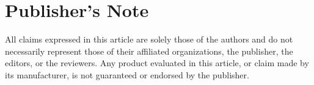 \section{Publisher's Note}

All claims expressed in this article are solely those of the authors and do not necessarily represent those of their affiliated organizations, the publisher, the editors, or the reviewers. Any product evaluated in this article, or claim made by its manufacturer, is not guaranteed or endorsed by the publisher.
